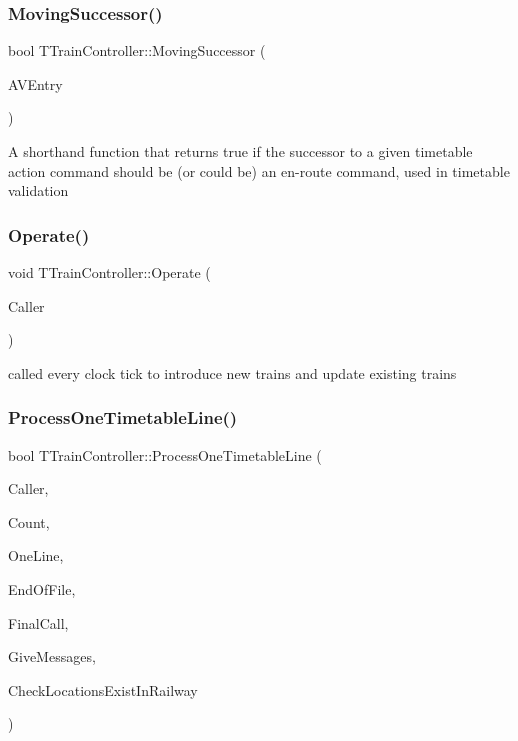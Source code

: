 \subsubsection{\texorpdfstring{Moving\+Successor()}{MovingSuccessor()}}
{\footnotesize\ttfamily bool T\+Train\+Controller\+::\+Moving\+Successor (\begin{DoxyParamCaption}\item[{const \mbox{\hyperlink{class_t_action_vector_entry}{T\+Action\+Vector\+Entry}} \&}]{A\+V\+Entry }\end{DoxyParamCaption})}

A shorthand function that returns true if the successor to a given timetable action command should be (or could be) an en-\/route command, used in timetable validation \mbox{\label{class_t_train_controller_a20a1576dea1d86ed78fc5e9f46343481}} 
\subsubsection{\texorpdfstring{Operate()}{Operate()}}
{\footnotesize\ttfamily void T\+Train\+Controller\+::\+Operate (\begin{DoxyParamCaption}\item[{int}]{Caller }\end{DoxyParamCaption})}

called every clock tick to introduce new trains and update existing trains \mbox{\label{class_t_train_controller_a5c51eb1e0018e189966ffdbc5d251990}} 
\subsubsection{\texorpdfstring{Process\+One\+Timetable\+Line()}{ProcessOneTimetableLine()}}
{\footnotesize\ttfamily bool T\+Train\+Controller\+::\+Process\+One\+Timetable\+Line (\begin{DoxyParamCaption}\item[{int}]{Caller,  }\item[{int}]{Count,  }\item[{Ansi\+String}]{One\+Line,  }\item[{bool \&}]{End\+Of\+File,  }\item[{bool}]{Final\+Call,  }\item[{bool}]{Give\+Messages,  }\item[{bool}]{Check\+Locations\+Exist\+In\+Railway }\end{DoxyParamCaption})}

